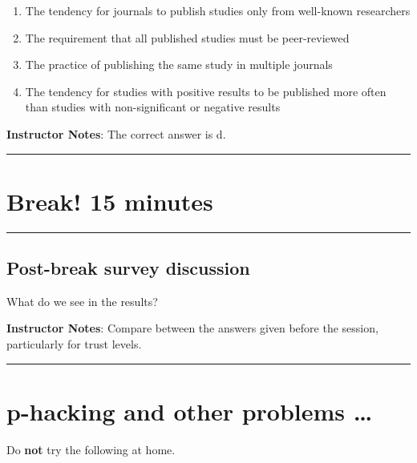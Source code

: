 \documentclass[
  english,
  letterpaper,
  DIV=11,
  numbers=noendperiod]{scrartcl}
\begin{document}
\begin{enumerate}
\def\labelenumi{\alph{enumi}.}
\item
  The tendency for journals to publish studies only from well-known
  researchers
\item
  The requirement that all published studies must be peer-reviewed
\item
  The practice of publishing the same study in multiple journals
\item
  The tendency for studies with positive results to be published more
  often than studies with non-significant or negative results
\end{enumerate}

\textbf{Instructor Notes}: The correct answer is d.~

\begin{center}\rule{0.5\linewidth}{0.5pt}\end{center}

\section{Break! 15 minutes}\label{break-15-minutes}

\begin{center}\rule{0.5\linewidth}{0.5pt}\end{center}

\subsection{Post-break survey
discussion}\label{post-break-survey-discussion}

What do we see in the results?

\textbf{Instructor Notes}: Compare between the answers given before the
session, particularly for trust levels.

\begin{center}\rule{0.5\linewidth}{0.5pt}\end{center}

\section{p-hacking and other problems
\ldots{}}\label{p-hacking-and-other-problems}

\begin{tcolorbox}[enhanced jigsaw, arc=.35mm, bottomrule=.15mm, bottomtitle=1mm, breakable, colback=white, colbacktitle=quarto-callout-warning-color!10!white, colframe=quarto-callout-warning-color-frame, coltitle=black, left=2mm, leftrule=.75mm, opacityback=0, opacitybacktitle=0.6, rightrule=.15mm, title=\textcolor{quarto-callout-warning-color}{\faExclamationTriangle}\hspace{0.5em}{Warning}, titlerule=0mm, toprule=.15mm, toptitle=1mm]

Do \textbf{not} try the following at home.

\end{tcolorbox}
\end{document}
